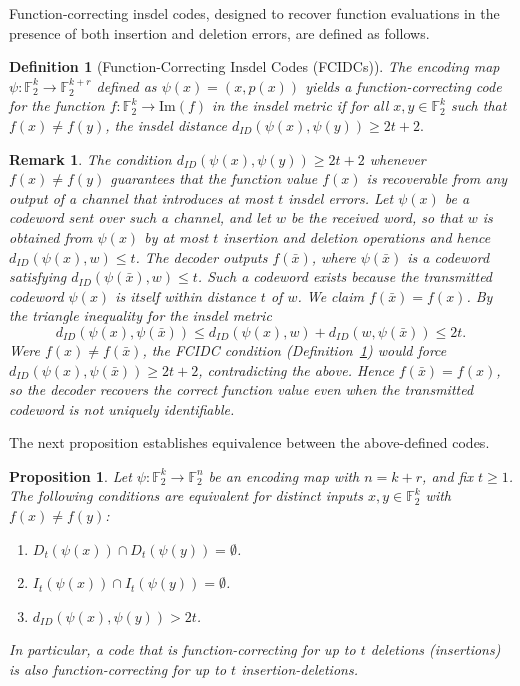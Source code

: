 \documentclass[11 pt]{article}
\numberwithin{equation}{section}
\newtheorem{proposition}[theorem]{Proposition}
\newtheorem{definition}[theorem]{Definition}
\newtheorem{remark}[theorem]{Remark}
\begin{document}
    Function-correcting insdel codes, designed to recover function evaluations in the presence of both insertion and deletion errors, are defined as follows.
    
    \begin{definition}[Function-Correcting Insdel Codes (FCIDCs)]
    \label{def:fcidc}
        The encoding map $\psi: \mathbb{F}_2^k \rightarrow \mathbb{F}_2^{k+r}$ defined as $\psi(x) = (x, p(x))$ yields a function-correcting code for the function $f: \mathbb{F}_2^k \rightarrow \mathrm{Im}(f)$ in the insdel metric if for all $x,y \in \mathbb{F}_2^k$ such that $f(x) \neq f(y)$, the insdel distance $d_{ID}(\psi(x), \psi(y)) \geq 2t+2.$
    \end{definition}
    


    \begin{remark}
        The condition $d_{ID}(\psi(x),\psi(y))\ge 2t+2$ whenever $f(x)\ne f(y)$ guarantees that the function value $f(x)$ is recoverable from any output of a channel that introduces at most $t$ insdel errors. Let $\psi(x)$ be a codeword sent over such a channel, and let $w$ be the received word, so that $w$ is obtained from $\psi(x)$ by at most $t$ insertion and deletion operations and hence $d_{ID}(\psi(x),w)\le t$. The decoder outputs $f(\bar{x})$, where $\psi(\bar{x})$ is a codeword satisfying $d_{ID}(\psi(\bar{x}), w) \leq t$. Such a codeword exists because the transmitted codeword $\psi(x)$ is itself within distance $t$ of $w$. We claim $f(\bar{x})=f(x)$. By the triangle inequality for the insdel metric
        \[
        d_{ID}(\psi(x), \psi(\bar{x})) \leq d_{ID}(\psi(x), w) + d_{ID}(w, \psi(\bar{x})) \leq 2t.
        \]
        Were $f(x)\ne f(\bar{x})$, the FCIDC condition (Definition~\ref{def:fcidc}) would force $d_{ID}(\psi(x),\psi(\bar{x}))\ge 2t+2$, contradicting the above. Hence $f(\bar{x})=f(x)$, so the decoder recovers the correct function value even when the transmitted codeword is not uniquely identifiable.
    \end{remark}

       
    The next proposition establishes equivalence between the above-defined codes. 
    
    \begin{proposition}
        Let $\psi:\mathbb{F}_2^k\to\mathbb{F}_2^{n}$ be an encoding map with $n=k+r$, and fix $t\ge 1$. 
        The following conditions are equivalent for distinct inputs $x,y\in\mathbb{F}_2^k$ with $f(x)\neq f(y)$:
        \begin{enumerate}
          \item $D_t(\psi(x))\cap D_t(\psi(y))= \emptyset$.
          \item $I_t(\psi(x))\cap I_t(\psi(y))= \emptyset$.
          \item $d_{ID}(\psi(x),\psi(y))>2t$.
        \end{enumerate}
        In particular, a code that is function-correcting for up to $t$ deletions (insertions) is also function-correcting for up to $t$ insertion-deletions.
    \end{proposition}
\end{document}
